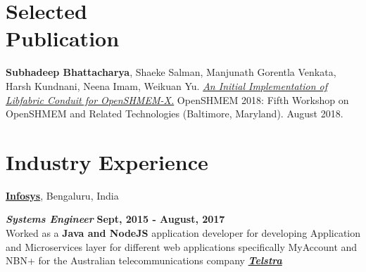 \documentclass[margin,line]{res}
\newenvironment{list2}{
  \begin{list}{$\bullet$}{%
      \setlength{\itemsep}{0in}
      \setlength{\parsep}{0in} \setlength{\parskip}{0in}
      \setlength{\topsep}{0in} \setlength{\partopsep}{0in} 
      \setlength{\leftmargin}{0.2in}}}{\end{list}}
\begin{document}
\begin{resume}
\vspace*{-.15in}

\section{\sc Selected \\Publication}
{\bf Subhadeep Bhattacharya}, Shaeke Salman, Manjunath Gorentla Venkata, Harsh 
Kundnani, Neena Imam, Weikuan Yu. 
{\href{https://www.csm.ornl.gov/workshops/openshmem2018/presentations/openshmem18-paper5.pdf}{\textit{An
			Initial Implementation of Libfabric Conduit for OpenSHMEM-X.}}} 
			OpenSHMEM 2018: 
Fifth Workshop on OpenSHMEM and Related Technologies (Baltimore, Maryland). 
August 2018.

\vspace*{-.15in}



\section{\sc Industry Experience}
{\bf \href{https://www.infosys.com/}{Infosys}}, Bengaluru, India

\vspace{-.4cm}
\textbf{{\em Systems Engineer}} \hfill {\bf Sept, 2015 - August, 2017}\\
Worked as a {\bf Java and NodeJS} application developer for developing 
Application and Microservices layer for different web applications specifically 
MyAccount and NBN+ for the Australian telecommunications company
\textbf{\textit{\href{https://www.telstra.com.au/Telstra/}{Telstra}}}

\vspace*{-.15in}


\end{resume}
\end{document}
